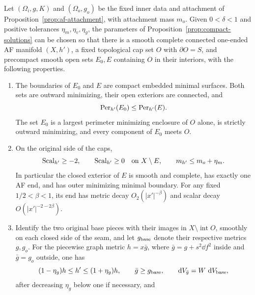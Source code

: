 \begin{proposition}
\label{prop:af-comparison}
Let \((\Omega_i,g,K)\) and \((\Omega_o,g_o)\) be the fixed inner data
and attachment of Proposition~\ref{prop:af-attachment}, with attachment
mass \(m_o\).  Given \(0<\delta<1\) and positive tolerances
\(\eta_m,\eta_v,\eta_g\), the parameters of
Proposition~\ref{prop:compact-solutions} can be chosen so that there is
a smooth complete connected one-ended AF manifold \((X,h')\), a fixed
topological cap set \(O\) with \(\partial O=S\), and precompact smooth
open sets \(E_0,E\) containing \(O\) in their interiors, with the
following properties.
\begin{enumerate}[label=\textup{(\roman*)}]
\item The boundaries of \(E_0\) and \(E\) are compact embedded minimal
surfaces.  Both sets are outward minimizing, their open exteriors are
connected, and
\begin{equation}
 \operatorname{Per}_{h'}(E_0)\le \operatorname{Per}_{h'}(E).
 \label{eq:unsafe-two-perimeters}
\end{equation}
The set \(E_0\) is a largest perimeter minimizing enclosure of \(O\)
alone, is strictly outward minimizing, and every component of \(E_0\)
meets \(O\).
\item On the original side of the caps,
\begin{equation}
 \operatorname{Scal}_{h'}\ge-2,\qquad
 \operatorname{Scal}_{h'}\ge0\quad\hbox{on }X\setminus E,\qquad
 m_{h'}\le m_o+\eta_m .
 \label{eq:unsafe-comparison-output}
\end{equation}
In particular the closed exterior of \(E\) is smooth and complete,
has exactly one AF end, and has outer minimizing minimal boundary.
For any fixed \(1/2<\beta<1\), its end has metric decay
\(O_2(|x'|^{-\beta})\) and scalar decay
\(O(|x'|^{-2-2\beta})\).
\item Identify the two original base pieces with their images in
\(X\setminus\operatorname{int}O\), smoothly on each closed side of
the seam, and let \(g_{\rm base}\) denote their respective metrics
\(g,g_o\).  For the piecewise graph metric
\(h=x\bar g\), where \(\bar g=g+s^2\dd f^2\) inside and
\(\bar g=g_o\) outside, one has
\begin{equation}
 (1-\eta_g)h\le h'\le(1+\eta_g)h,\qquad
 \bar g\ge g_{\rm base},\qquad
 \mathop{}\!\mathrm d V_{\bar g}=W\,\mathop{}\!\mathrm d V_{\rm base},
 \label{eq:unsafe-metric-output}
\end{equation}
after decreasing \(\eta_g\) below one if necessary, and
\begin{equation}

\end{equation}
\end{enumerate}
\end{proposition}
